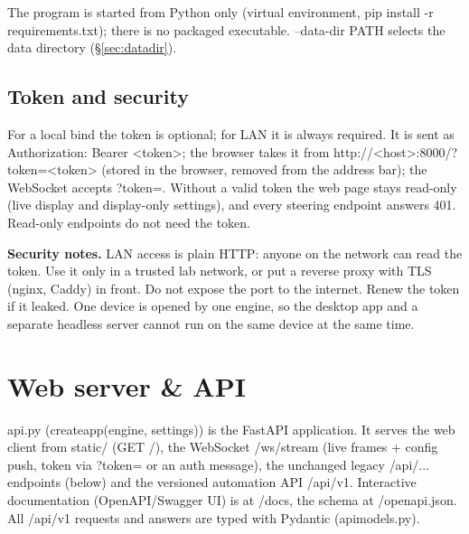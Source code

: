 \documentclass[12pt,a4paper]{article}
\DeclareRobustCommand{\code}[1]{{\ttfamily\small\def\_{\rawus\allowbreak}#1}}
\DeclareRobustCommand{\file}[1]{{\ttfamily\small\def\_{\rawus\allowbreak}#1}}
\begin{document}
The program is started from Python only (virtual environment,
\code{pip install -r requirements.txt}); there is no packaged executable.
\code{--data-dir PATH} selects the data directory (\S\ref{sec:datadir}).

\subsection{Token and security}
For a local bind the token is optional; for LAN it is always required. It is sent as
\code{Authorization: Bearer <token>}; the browser takes it from
\code{http://<host>:8000/?token=<token>} (stored in the browser, removed from the
address bar); the WebSocket accepts \code{?token=}. Without a valid token the web
page stays read-only (live display and display-only settings), and every steering
endpoint answers 401. Read-only endpoints do not need the token.

\medskip\noindent\textbf{Security notes.}
LAN access is plain HTTP: anyone on the network can read the token. Use it only in
a trusted lab network, or put a reverse proxy with TLS (nginx, Caddy) in front. Do
not expose the port to the internet. Renew the token if it leaked. One device is
opened by one engine, so the desktop app and a separate headless server cannot run
on the same device at the same time.

\section{Web server \& API}\label{sec:api}
\file{api.py} (\code{create\_app(engine, settings)}) is the FastAPI application. It
serves the web client from \code{static/} (\code{GET /}), the WebSocket
\code{/ws/stream} (live frames + config push, token via \code{?token=} or an
\code{auth} message), the unchanged legacy \code{/api/...} endpoints (below) and the
versioned automation API \code{/api/v1}. Interactive documentation
(OpenAPI\slash Swagger UI) is at \code{/docs}, the schema at \code{/openapi.json}.
All \code{/api/v1} requests and answers are typed with Pydantic
(\file{api\_models.py}).
\end{document}
